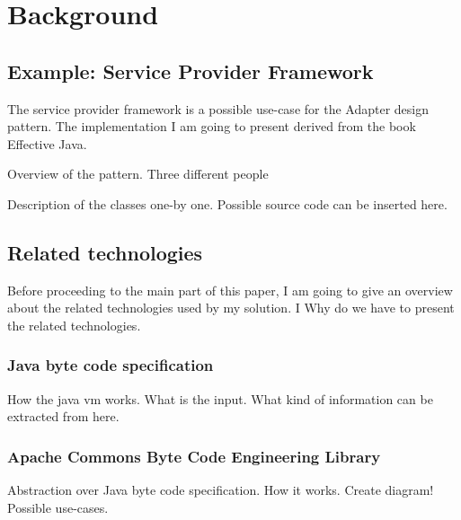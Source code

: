 \chapter{Background}

\section{Example: Service Provider Framework}
\label{sect:example}

The service provider framework is a possible use-case for the Adapter design
pattern. The implementation I am going to present derived from the book
\cite{Bloch08} Effective Java.

Overview of the pattern. 
Three different people 

Description of the classes one-by one. Possible source code can be inserted
here.


\section{Related technologies}
Before proceeding to the main part of this paper, I am going to give an overview
about the related technologies used by my solution. I Why do we have to present
the related technologies.


\subsection{Java byte code specification}
How the java vm works.
What is the input.
What kind of information can be extracted from here.


\subsection{Apache Commons Byte Code Engineering Library}
\cite{BCEL}
Abstraction over Java byte code specification. 
How it works. Create diagram!
Possible use-cases.

